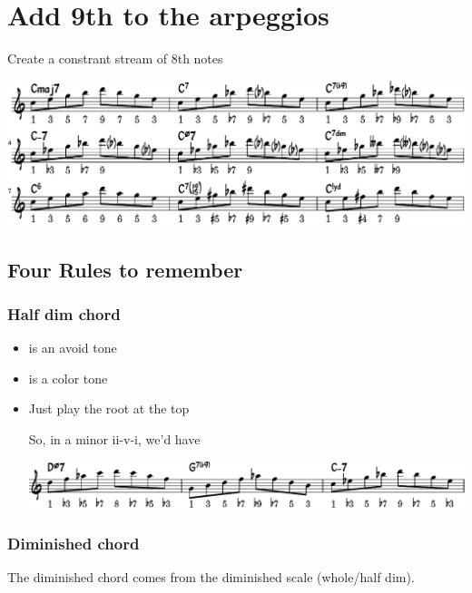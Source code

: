 \documentclass[11pt]{article}
\begin{document}
\section{Add 9th to the arpeggios}
\label{sec:org633d2cb}

Create a constrant stream of 8th notes

\begin{center}
\includegraphics[width=0.98\linewidth]{arpeggeio-to-9th.pdf}
\end{center}

\subsection{Four Rules to remember}
\label{sec:org48e9293}
\subsubsection{Half dim chord}
\label{sec:orgcfa1b45}
\begin{itemize}
\item {} is an avoid tone
\item {} is a color tone
\item Just play the root at the top

So, in a minor ii-v-i, we'd have

\begin{center}
\includegraphics[width=0.98\linewidth]{arpeg-9th-half-dim.pdf}
\end{center}
\end{itemize}

\subsubsection{Diminished chord}
\label{sec:org0696597}

The diminished chord comes from the diminished scale (whole/half dim).
\end{document}
